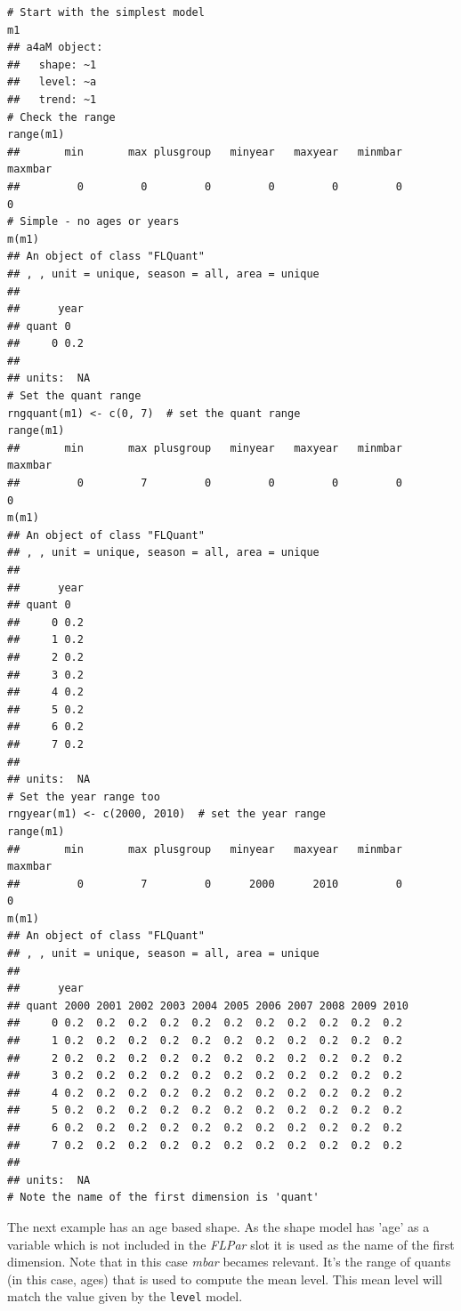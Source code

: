 \documentclass[a4paper,english,10pt]{article}\usepackage[]{graphicx}\usepackage[]{color}
\makeatletter
\newenvironment{kframe}{%
 \def\at@end@of@kframe{}%
 \ifinner\ifhmode%
  \def\at@end@of@kframe{\end{minipage}}%
  \begin{minipage}{\columnwidth}%
 \fi\fi%
 \def\FrameCommand##1{\hskip\@totalleftmargin \hskip-\fboxsep
 \colorbox{shadecolor}{##1}\hskip-\fboxsep
     \hskip-\linewidth \hskip-\@totalleftmargin \hskip\columnwidth}%
 \MakeFramed {\advance\hsize-\width
   \@totalleftmargin\z@ \linewidth\hsize
   \@setminipage}}%
 {\par\unskip\endMakeFramed%
 \at@end@of@kframe}
\newenvironment{knitrout}{}{} %
\newcommand{\code}[1]{{\texttt{#1}}}
\newcommand{\class}[1]{{\textit{#1}}}
\makeatother
\begin{document}
\begin{knitrout}
\color{fgcolor}\begin{kframe}
\begin{verbatim}
# Start with the simplest model
m1
## a4aM object:
##   shape: ~1
##   level: ~a
##   trend: ~1
# Check the range
range(m1)
##       min       max plusgroup   minyear   maxyear   minmbar   maxmbar 
##         0         0         0         0         0         0         0
# Simple - no ages or years
m(m1)
## An object of class "FLQuant"
## , , unit = unique, season = all, area = unique
## 
##      year
## quant 0  
##     0 0.2
## 
## units:  NA
# Set the quant range
rngquant(m1) <- c(0, 7)  # set the quant range
range(m1)
##       min       max plusgroup   minyear   maxyear   minmbar   maxmbar 
##         0         7         0         0         0         0         0
m(m1)
## An object of class "FLQuant"
## , , unit = unique, season = all, area = unique
## 
##      year
## quant 0  
##     0 0.2
##     1 0.2
##     2 0.2
##     3 0.2
##     4 0.2
##     5 0.2
##     6 0.2
##     7 0.2
## 
## units:  NA
# Set the year range too
rngyear(m1) <- c(2000, 2010)  # set the year range
range(m1)
##       min       max plusgroup   minyear   maxyear   minmbar   maxmbar 
##         0         7         0      2000      2010         0         0
m(m1)
## An object of class "FLQuant"
## , , unit = unique, season = all, area = unique
## 
##      year
## quant 2000 2001 2002 2003 2004 2005 2006 2007 2008 2009 2010
##     0 0.2  0.2  0.2  0.2  0.2  0.2  0.2  0.2  0.2  0.2  0.2 
##     1 0.2  0.2  0.2  0.2  0.2  0.2  0.2  0.2  0.2  0.2  0.2 
##     2 0.2  0.2  0.2  0.2  0.2  0.2  0.2  0.2  0.2  0.2  0.2 
##     3 0.2  0.2  0.2  0.2  0.2  0.2  0.2  0.2  0.2  0.2  0.2 
##     4 0.2  0.2  0.2  0.2  0.2  0.2  0.2  0.2  0.2  0.2  0.2 
##     5 0.2  0.2  0.2  0.2  0.2  0.2  0.2  0.2  0.2  0.2  0.2 
##     6 0.2  0.2  0.2  0.2  0.2  0.2  0.2  0.2  0.2  0.2  0.2 
##     7 0.2  0.2  0.2  0.2  0.2  0.2  0.2  0.2  0.2  0.2  0.2 
## 
## units:  NA
# Note the name of the first dimension is 'quant'
\end{verbatim}
\end{kframe}
\end{knitrout}


The next example has an age based shape. As the shape model has 'age' as a variable which is not included in the \class{FLPar} slot it is used as the name of the first dimension. Note that in this case \emph{mbar} becames relevant. It's the range of quants (in this case, ages) that is used to compute the mean level. This mean level will match the value given by the \code{level} model.
\end{document}
